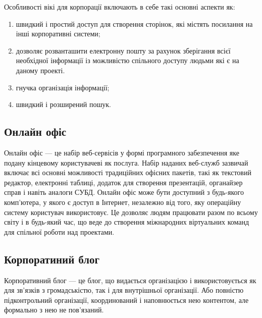 \par Особливості вікі для корпорації включають в себе такі основні аспекти як:
\begin{enumerate}
\item швидкий і простий доступ для створення сторінок, які містять посилання на інші корпоративні системи;
\item дозволяє розванташити електронну пошту за рахунок зберігання всієї необхідної інформації із можливістю спільного доступу людьми які є на даному проекті.
\item гнучка організація інформації;
\item швидкий і розширений пошук.
\end{enumerate}



\subsection{Онлайн офіс}
Онлайн офіс --- це набір веб-сервісів у формі програмного забезпечення яке подану кінцевому користувачеві як послуга. 
Набір наданих веб-служб зазвичай включає всі основні можливості традиційних офісних пакетів, такі як текстовий редактор, електронні таблиці, додаток для створення презентацій, органайзер справ і навіть аналоги СУБД. 
Онлайн офіс може бути доступний з будь-якого комп'ютера, у якого є доступ в Інтернет, незалежно від того, яку операційну систему користувач використовує. 
Це дозволяє людям працювати разом по всьому світу і в будь-який час, що веде до створення міжнародних віртуальних команд для спільної роботи над проектами. 


\subsection{Корпоратиний блог}
Корпоративний блог --- це блог, що видається організацією і використовується як для зв'язків з громадськістю, так і для внутрішньої організації. 
Або повністю підконтрольний організації, координований і наповнюється нею контентом, але формально з нею не пов'язаний.



